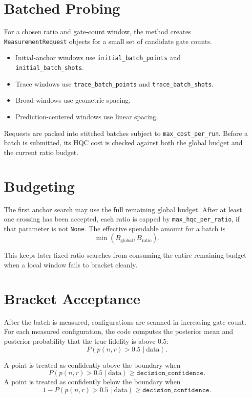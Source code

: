 \documentclass[11pt]{article}
\begin{document}
\section{Batched Probing}

For a chosen ratio and gate-count window, the method creates
\texttt{MeasurementRequest} objects for a small set of candidate gate counts.

\begin{itemize}[leftmargin=*]
    \item Initial-anchor windows use \texttt{initial\_batch\_points} and
    \texttt{initial\_batch\_shots}.
    \item Trace windows use \texttt{trace\_batch\_points} and
    \texttt{trace\_batch\_shots}.
    \item Broad windows use geometric spacing.
    \item Prediction-centered windows use linear spacing.
\end{itemize}

Requests are packed into stitched batches subject to
\texttt{max\_cost\_per\_run}. Before a batch is submitted, its HQC cost is
checked against both the global budget and the current ratio budget.

\section{Budgeting}

The first anchor search may use the full remaining global budget. After at
least one crossing has been accepted, each ratio is capped by
\texttt{max\_hqc\_per\_ratio}, if that parameter is not \texttt{None}. The
effective spendable amount for a batch is
\[
    \min(B_{\mathrm{global}}, B_{\mathrm{ratio}}).
\]

This keeps later fixed-ratio searches from consuming the entire remaining
budget when a local window fails to bracket cleanly.

\section{Bracket Acceptance}

After the batch is measured, configurations are scanned in increasing gate
count. For each measured configuration, the code computes the posterior mean
and posterior probability that the true fidelity is above $0.5$:
\[
    P(p(n,r) > 0.5 \mid \mathrm{data}).
\]

A point is treated as confidently above the boundary when
\[
    P(p(n,r) > 0.5 \mid \mathrm{data})
    \geq
    \texttt{decision\_confidence}.
\]
A point is treated as confidently below the boundary when
\[
    1 -
    P(p(n,r) > 0.5 \mid \mathrm{data})
    \geq
    \texttt{decision\_confidence}.
\]
\end{document}
